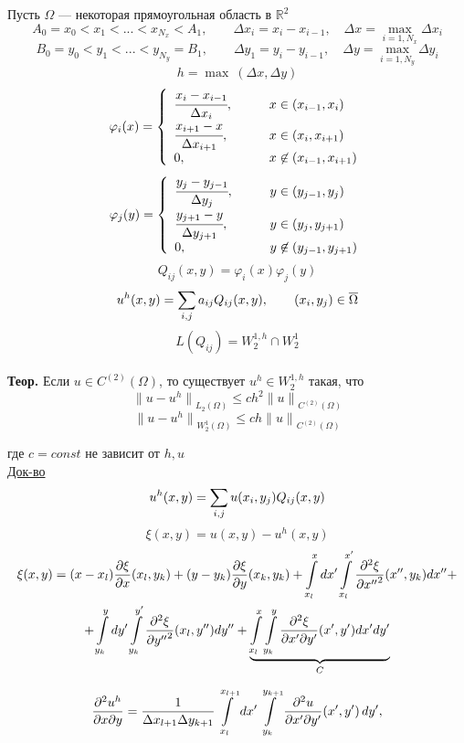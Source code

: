 Пусть $\Omega$ --- некоторая прямоугольная область в $\mathbb{R}^2$
\[ A_0 = x_0 < x_1 < ... < x_{N_x} < A_1, \qquad \Delta x_i = x_i - x_{i-1}, \quad \Delta x = \underset{i=1, N_x}{\max} \Delta x_i \]
\[ B_0 = y_0 < y_1 < ... < y_{N_y} = B_1, \qquad \Delta y_1 = y_i - y_{i-1}, \quad \Delta y = \underset{i=1, N_y}{\max} \Delta y_i \]
\[ h = \max \ (\Delta x, \Delta y) \]
\[ \varphi_i(x) =
\left\{
\begin{array}{ll}
	\cfrac{x_i - x_{i-1}}{\Delta x_i}, \qquad & x \in (x_{i-1}, x_i) \\
	\cfrac{x_{i+1} - x}{\Delta x_{i+1}}, \qquad & x \in (x_i, x_{i+1}) \\
	0, \qquad & x \not \in (x_{i-1}, x_{i+1})
\end{array}
\right.
\]
\[ \varphi_j(y) =
\left\{
\begin{array}{ll}
	\cfrac{y_j - y_{j-1}}{\Delta y_j}, \qquad & y \in (y_{j-1}, y_j) \\
	\cfrac{y_{j+1} - y}{\Delta y_{j+1}}, \qquad & y \in (y_j, y_{j+1}) \\
	0, \qquad & y \not \in (y_{j-1}, y_{j+1})
\end{array}
\right.
\]
\[ Q_{ij} (x, y) = \varphi_i(x) \varphi_j(y) \]
\[ u^h(x,y) = \sum\limits_{i, j} a_{ij} Q_{ij}(x, y), \qquad (x_i, y_j) \in \overline{\Omega} \]
\[ L(Q_{ij}) = W_2^{1, h} \cap W_2^1 \] \\

\textbf{Теор.} Если $ u \in C^{(2)} (\Omega)$, то существует  $u^h \in W^{1, h}_2$ такая, что
\[ {\|u - u^h\|}_{L_2(\Omega)} \leq c h^2 {\|u\|}_{C^{(2)} (\Omega)} \]
\[ {\|u-u^h\|}_{W_2^1(\Omega)} \leq c h {\| u \|}_{C^{(2)} (\Omega)} \]

где $c = const$ не зависит от $h, u$ \\

\underline{Док-во}
\[ u^h(x,y) = \sum\limits_{i, j} u(x_i, y_j) Q_{ij}(x, y) \]
\[ \xi (x, y) = u(x, y) - u^h(x,y) \]
\begin{multline*}
	\xi(x, y) = (x - x_l) \frac{\partial \xi}{\partial x} (x_l, y_k) + (y - y_k) \frac{\partial \xi}{\partial y} (x_k, y_k) + \int\limits_{x_l}^{x} dx' \int\limits_{x_l}^{x'} \frac{\partial^2 \xi}{{\partial x''}^2} (x'', y_k) dx'' + \\
	+ \int\limits_{y_k}^{y}dy' \int\limits_{y_k}^{y'} \frac{\partial ^2 \xi}{{\partial y''}^2}(x_l, y'') d y'' + \underbrace{\int\limits_{x_l}^{x} \int\limits_{y_k}^{y} \frac{\partial ^2 \xi}{\partial x' \partial y'} (x', y') dx' dy'}_{C}
\end{multline*}

\[\frac{\partial^2 u^h}{\partial x \partial y} = \frac{1}{\Delta x_{l+1} \Delta y_{k+1}} \int\limits_{x_l}^{x_{l+1}} dx' \int\limits_{y_k}^{y_{k+1}} \frac{\partial^2 u}{\partial x' \partial y'}(x', y') \, dy',\]



